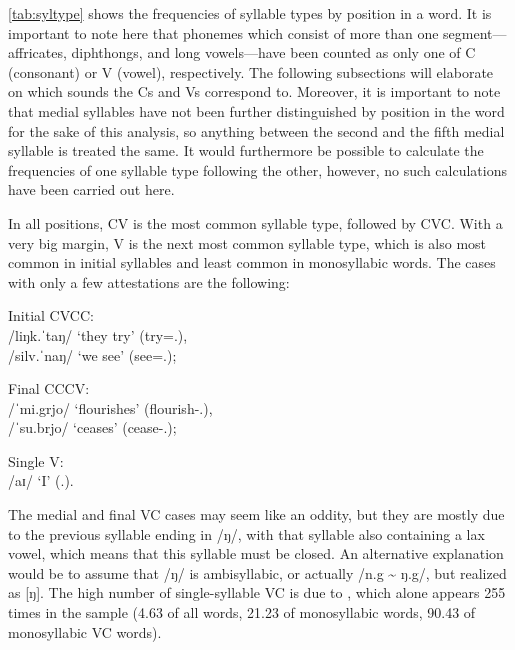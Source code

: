 \autoref{tab:syltype} shows the frequencies of syllable 
types by position in a word. It is important to note here 
that phonemes which consist of more than one segment---affricates, diphthongs, 
and long vowels---have been counted as only one of C (consonant) or V (vowel), 
respectively. The following subsections will elaborate on which sounds the Cs 
and Vs correspond to. Moreover, it is important to note that medial syllables 
have not been further distinguished by position in the word for the sake of 
this analysis, so anything between the second and the fifth medial syllable is 
treated the same. It would furthermore be possible to calculate the frequencies 
of one syllable type following the other, however, no such calculations have 
been carried out here.

In all positions, CV is the most common syllable type, followed by CVC. With a 
very big margin, V is the next most common syllable type, which is also most 
common in initial syllables and least common in monosyllabic words. The cases 
with only a few attestations are the following:

\pex
	\a Initial CVCC:\\
		 /liŋk.ˈtaŋ/ `they try' 
			(try=\TplM{}.\Aarg{}),\footnotemark\\
		 /silv.ˈnaŋ/ `we see' 
			(see=\Fpl{}.\Aarg{});
		
	\a Final CCCV:\\
		 /ˈmi.grjo/ `flourishes' 
			(flourish-\Tsg{}.\N{}),\\
		 /ˈsu.brjo/ `ceases' (cease-\Tsg{}.\N{});
	
	\a Single V:\\
		 /aɪ/ `I' (\Fsg{}.\Top{}).
\xe


%
The medial and final VC cases may seem like an oddity, but they are mostly due 
to the previous syllable ending in /ŋ/, with that syllable also containing a 
lax vowel, which means that this syllable must be closed. An alternative 
explanation would be to assume that /ŋ/ is ambisyllabic, or actually /n.g 
\textasciitilde{} ŋ.g/, but realized as [ŋ].\label{ŋ} The high number of 
single-syllable VC is due to , which alone appears 255 
times in the sample (4.63\pct{} of all words, 21.23\pct{} of monosyllabic 
words, 90.43\pct{} of monosyllabic VC words).

